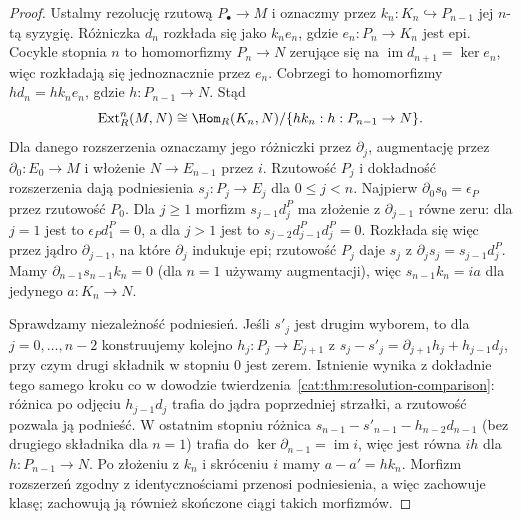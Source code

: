 \begin{proof}
Ustalmy rezolucję rzutową $P_\bullet\to M$ i oznaczmy przez $k_n:K_n\hookrightarrow P_{n-1}$ jej $n$-tą syzygię. Różniczka $d_n$ rozkłada się jako $k_ne_n$, gdzie $e_n:P_n\to K_n$ jest epi. Cocykle stopnia $n$ to homomorfizmy $P_n\to N$ zerujące się na $\operatorname{im}d_{n+1}=\ker e_n$, więc rozkładają się jednoznacznie przez $e_n$. Cobrzegi to homomorfizmy $h d_n=h k_ne_n$, gdzie $h:P_{n-1}\to N$. Stąd
\[
 \operatorname{Ext}_R^n(M,N)\cong
 \Hom_R(K_n,N)/\{hk_n:h:P_{n-1}\to N\}.
\]
Dla danego rozszerzenia oznaczamy jego różniczki przez $\partial_j$, augmentację przez $\partial_0:E_0\to M$ i włożenie $N\to E_{n-1}$ przez $i$. Rzutowość $P_j$ i dokładność rozszerzenia dają podniesienia $s_j:P_j\to E_j$ dla $0\le j<n$. Najpierw $\partial_0s_0=\epsilon_P$ przez rzutowość $P_0$. Dla $j\ge1$ morfizm $s_{j-1}d_j^P$ ma złożenie z $\partial_{j-1}$ równe zeru: dla $j=1$ jest to $\epsilon_Pd_1^P=0$, a dla $j>1$ jest to $s_{j-2}d_{j-1}^Pd_j^P=0$. Rozkłada się więc przez jądro $\partial_{j-1}$, na które $\partial_j$ indukuje epi; rzutowość $P_j$ daje $s_j$ z $\partial_js_j=s_{j-1}d_j^P$. Mamy $\partial_{n-1}s_{n-1}k_n=0$ (dla $n=1$ używamy augmentacji), więc $s_{n-1}k_n=ia$ dla jedynego $a:K_n\to N$.

Sprawdzamy niezależność podniesień. Jeśli $s'_j$ jest drugim wyborem, to dla $j=0,\ldots,n-2$ konstruujemy kolejno $h_j:P_j\to E_{j+1}$ z
$s_j-s'_j=\partial_{j+1}h_j+h_{j-1}d_j$, przy czym drugi składnik w stopniu $0$ jest zerem. Istnienie wynika z dokładnie tego samego kroku co w dowodzie twierdzenia~\ref{cat:thm:resolution-comparison}: różnica po odjęciu $h_{j-1}d_j$ trafia do jądra poprzedniej strzałki, a rzutowość pozwala ją podnieść. W ostatnim stopniu różnica $s_{n-1}-s'_{n-1}-h_{n-2}d_{n-1}$ (bez drugiego składnika dla $n=1$) trafia do $\ker\partial_{n-1}=\operatorname{im}i$, więc jest równa $ih$ dla $h:P_{n-1}\to N$. Po złożeniu z $k_n$ i skróceniu $i$ mamy $a-a'=hk_n$. Morfizm rozszerzeń zgodny z identycznościami przenosi podniesienia, a więc zachowuje klasę; zachowują ją również skończone ciągi takich morfizmów.


\end{proof}
